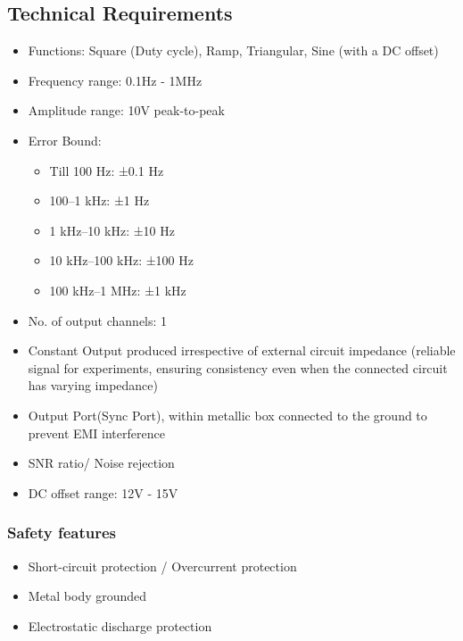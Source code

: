 \documentclass[12pt,a4paper]{article}
\begin{document}
\subsection{Technical Requirements}
\parencite{functionGenerator}
\parencite{scientech4064s}
\parencite{scientific_mes_technik_2015}
\parencite{rgpv_signal_generator}
\begin{itemize}

  \item Functions: Square (Duty cycle), Ramp, Triangular, Sine (with a DC offset)

  \item Frequency range: 0.1Hz - 1MHz
  \item Amplitude range: 10V peak-to-peak
  \item Error Bound:
  \parencite{tektronix_cfg253_1993}
  \begin{itemize}
    \item Till 100 Hz: ±0.1 Hz
    \item 100--1 kHz: ±1 Hz
    \item 1 kHz--10 kHz: ±10 Hz
    \item 10 kHz--100 kHz: ±100 Hz
    \item 100 kHz--1 MHz: ±1 kHz
  \end{itemize}

  \item No. of output channels: 1
  
  \item Constant Output produced irrespective of external circuit impedance
(reliable signal for experiments, ensuring consistency even when the connected circuit has varying impedance) \parencite{bhavanishankar2021design}
  \item Output Port(Sync Port), within metallic box connected to the ground to prevent EMI interference 
  \item SNR ratio/ Noise rejection
  \item DC offset range: 12V - 15V


\end{itemize}

\subsubsection{Safety features}
\begin{itemize}
    \item Short-circuit protection / Overcurrent protection
    \item Metal body grounded
    \item Electrostatic discharge protection
\end{itemize}
\end{document}
